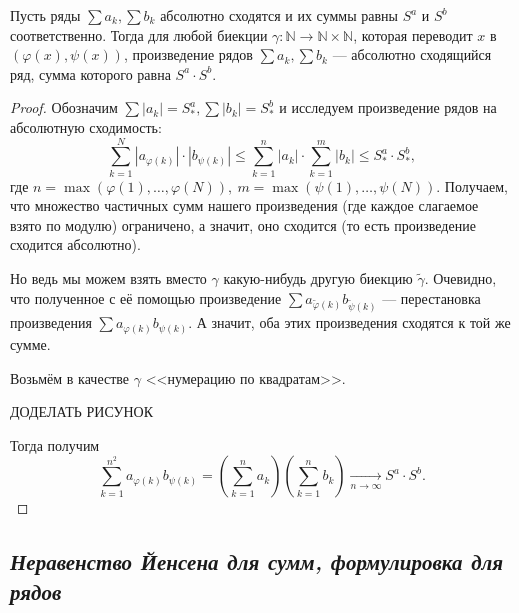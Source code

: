 \begin{theorem}
	Пусть ряды \(\sum a_k, \sum b_k\) абсолютно сходятся и их суммы равны \(S^a\) и \(S^b\) соответственно. Тогда для любой биекции \(\gamma \colon \mathbb{N} \to \mathbb{N} \times \mathbb{N}\), которая переводит \(x\) в \((\varphi(x), \psi(x))\), произведение рядов \(\sum a_k, \sum b_k\) --- абсолютно сходящийся ряд, сумма которого равна \(S^a \cdot S^b\).
\end{theorem}
\begin{proof}
	Обозначим \(\sum |a_k| = S_*^a, \sum |b_k| = S_*^b\) и исследуем произведение рядов на абсолютную сходимость: \[
	\sum_{k=1}^{N} |a_{\varphi(k)}| \cdot |b_{\psi(k)}| \leqslant \sum_{k=1}^{n} |a_k| \cdot \sum_{k=1}^{m} |b_k| \leqslant S_*^a \cdot S_*^b,
	\]
	где \(n = \max(\varphi(1), \ldots, \varphi(N)), \ m = \max(\psi(1), \ldots, \psi(N))\). Получаем, что множество частичных сумм нашего произведения (где каждое слагаемое взято по модулю) ограничено, а значит, оно сходится (то есть произведение сходится абсолютно).
	
	Но ведь мы можем взять вместо \(\gamma\) какую-нибудь другую биекцию \(\widetilde{\gamma}\). Очевидно, что полученное с её помощью произведение \(\sum a_{\widetilde{\varphi}(k)} b_{\widetilde{\psi}(k)}\) --- перестановка произведения \(\sum a_{\varphi(k)} b_{\psi(k)}\). А значит, оба этих произведения сходятся к той же сумме.
	
	Возьмём в качестве \(\gamma\) <<нумерацию по квадратам>>.
	
	ДОДЕЛАТЬ РИСУНОК
	
	Тогда получим \[
	\sum_{k=1}^{n^2} a_{\varphi(k)} b_{\psi(k)} = \left(\sum_{k=1}^n a_k \right) \left(\sum_{k=1}^n b_k \right) \xrightarrow[n \to \infty]{} S^a \cdot S^b.
	\]
\end{proof}

\subsection{\itshape Неравенство Йенсена для сумм, формулировка для рядов}

